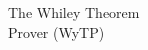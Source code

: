 \begin{titlepage}

\pagecolor{whileybrown}


\selectfont
\fontsize{37}{50}\selectfont

\noindent The Whiley Theorem\\ Prover (WyTP)\\

\vfill


\end{titlepage}
\pagecolor{white}
\clearpage
